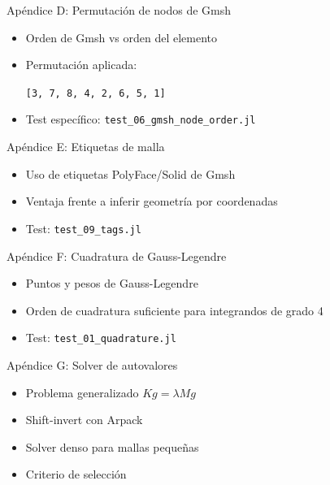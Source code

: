 \documentclass[aspectratio=169,11pt]{beamer}
\begin{document}
\begin{frame}{Apéndice D: Permutación de nodos de Gmsh}
  \begin{itemize}
    \item Orden de Gmsh vs orden del elemento
    \item Permutación aplicada:
      \begin{center}
        \texttt{[3, 7, 8, 4, 2, 6, 5, 1]}
      \end{center}
    \item Test específico: \texttt{test\_06\_gmsh\_node\_order.jl}
  \end{itemize}
\end{frame}

\begin{frame}{Apéndice E: Etiquetas de malla}
  \begin{itemize}
    \item Uso de etiquetas PolyFace/Solid de Gmsh
    \item Ventaja frente a inferir geometría por coordenadas
    \item Test: \texttt{test\_09\_tags.jl}
  \end{itemize}
\end{frame}

\begin{frame}{Apéndice F: Cuadratura de Gauss-Legendre}
  \begin{itemize}
    \item Puntos y pesos de Gauss-Legendre
    \item Orden de cuadratura suficiente para integrandos de grado 4
    \item Test: \texttt{test\_01\_quadrature.jl}
  \end{itemize}
\end{frame}

\begin{frame}{Apéndice G: Solver de autovalores}
  \begin{itemize}
    \item Problema generalizado $K g = \lambda M g$
    \item Shift-invert con Arpack
    \item Solver denso para mallas pequeñas
    \item Criterio de selección
  \end{itemize}
\end{frame}
\end{document}

